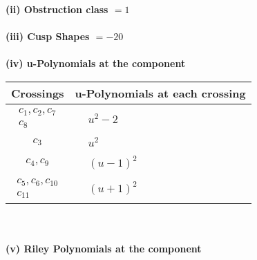\documentclass[1p]{elsarticle_modified}
\theoremstyle{definition}
\begin{document}
\flushleft \textbf{(ii) Obstruction class $= 1$}\\~\\
\flushleft \textbf{(iii) Cusp Shapes $= -20$}\\~\\
\newpage\renewcommand{\arraystretch}{1}
\flushleft \textbf{(iv) u-Polynomials at the component}\newline \\
\begin{tabular}{m{50pt}|m{274pt}}
Crossings & \hspace{64pt}u-Polynomials at each crossing \\
\hline $$\begin{aligned}c_{1},c_{2},c_{7}\\c_{8}\end{aligned}$$&$\begin{aligned}
&u^2-2
\end{aligned}$\\
\hline $$\begin{aligned}c_{3}\end{aligned}$$&$\begin{aligned}
&u^2
\end{aligned}$\\
\hline $$\begin{aligned}c_{4},c_{9}\end{aligned}$$&$\begin{aligned}
&(u-1)^2
\end{aligned}$\\
\hline $$\begin{aligned}c_{5},c_{6},c_{10}\\c_{11}\end{aligned}$$&$\begin{aligned}
&(u+1)^2
\end{aligned}$\\
\hline
\end{tabular}\\~\\
\newpage\renewcommand{\arraystretch}{1}
\flushleft \textbf{(v) Riley Polynomials at the component}\newline \\
\end{document}

